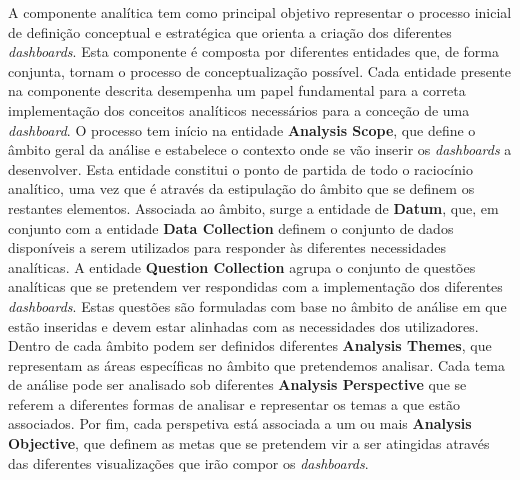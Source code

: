 A componente analítica tem como principal objetivo representar o processo inicial de definição conceptual e estratégica que orienta a criação dos diferentes \textit{dashboards}. Esta componente é composta por diferentes entidades que, de forma conjunta, tornam o processo de conceptualização possível. Cada entidade presente na componente descrita desempenha um papel fundamental para a correta implementação dos conceitos analíticos necessários para a conceção de uma \textit{dashboard}. O processo tem início na entidade \textbf{Analysis Scope}, que define o âmbito geral da análise e estabelece o contexto onde se vão inserir os \textit{dashboards} a desenvolver. Esta entidade constitui o ponto de partida de todo o raciocínio analítico, uma vez que é através da estipulação do âmbito que se definem os restantes elementos. Associada ao âmbito, surge a entidade de \textbf{Datum}, que, em conjunto com a entidade \textbf{Data Collection} definem o conjunto de dados disponíveis a serem utilizados para responder às diferentes necessidades analíticas. A entidade \textbf{Question Collection} agrupa o conjunto de questões analíticas que se pretendem ver respondidas com a implementação dos diferentes \textit{dashboards}. Estas questões são formuladas com base no âmbito de análise em que estão inseridas e devem estar alinhadas com as necessidades dos utilizadores. Dentro de cada âmbito podem ser definidos diferentes \textbf{Analysis Themes}, que representam as áreas específicas no âmbito que pretendemos analisar. Cada tema de análise pode ser analisado sob diferentes \textbf{Analysis Perspective} que se referem a diferentes formas de analisar e representar os temas a que estão associados. Por fim, cada perspetiva está associada a um ou mais \textbf{Analysis Objective}, que definem as metas que se pretendem vir a ser atingidas através das diferentes visualizações que irão compor os \textit{dashboards}.

